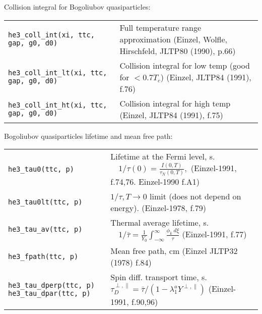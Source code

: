 \documentclass[a4paper]{article}
\begin{document}
\medskip

Collision integral for Bogoliubov quasiparticles:

\medskip
\noindent\begin{tabular}{lp{11cm}}
\tt he3\_coll\_int(xi, ttc, gap, g0, d0) &
   Full temperature range approximation\newline
   {\small (Einzel, Wolfle, Hirschfeld, JLTP80 (1990), p.66)}\\
\tt he3\_coll\_int\_lt(xi, ttc, gap, g0, d0) &
   Collision integral for low temp (good for $< 0.7 T_c$)\newline
   {\small (Einzel, JLTP84 (1991), f.76)}\\
\tt he3\_coll\_int\_ht(xi, ttc, gap, g0, d0) &
   Collision integral for high temp\newline
   {\small (Einzel, JLTP84 (1991), f.75)}\\
\end{tabular}
\medskip

Bogoliubov quasiparticles lifetime and mean free path:

\medskip
\noindent\begin{tabular}{p{4cm}p{11cm}}
\tt he3\_tau0(ttc, p)      & Lifetime at the Fermi level, s.
                           $\displaystyle\quad 1/\tau(0) = \frac{I (0,T)}{\tau_N(0,T)},$\newline
                            {\small(Einzel-1991, f.74,76. Einzel-1990 f.A1)}\\

\tt he3\_tau0lt(ttc, p)    & $\displaystyle 1/\tau, T\rightarrow0$ limit (does not depend on energy).
                            {\small(Einzel-1978, f.79)}\\
\tt he3\_tau\_av(ttc, p)   & Thermal average lifetime, s.
                           $\displaystyle\quad 1/\bar\tau = \frac{1}{Y_0}
                           \int_{-\infty}^{\infty} \frac{\phi_k\ d\xi}{\tau}$\newline
                            {\small(Einzel-1991, f.77)}\\
\tt he3\_fpath(ttc, p)     & Mean free path, cm\newline
                             {\small (Einzel JLTP32 (1978) f.84)}\\

\tt he3\_tau\_dperp(ttc, p)\newline
\tt he3\_tau\_dpar(ttc, p)  & Spin diff. transport time, s.
                           \ $\tau_D^{\perp,\parallel} = \bar\tau
                            /(1-\lambda_1^a Y^{\perp,\parallel})$\newline
                            {\small(Einzel-1991, f.90,96)}\\
\end{tabular}
\medskip
\end{document}
